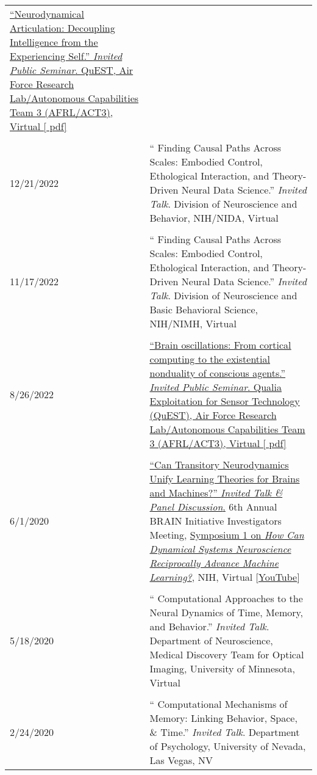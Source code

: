 \documentclass[10pt]{article}
\newcommand{\itemtitle}[1]{{\color{hopkinsblue}\ul{#1}}}
\newcommand{\unpubtitle}[1]{{\color{hopkinsblue} #1}}
\begin{document}
\begin{longtable}{@{\hspace{0.1in}}l>{\raggedright\arraybackslash}p{}}
  \href{https://jdmonaco.com/files/monaco-2023-afrl-quest-slides.pdf}
  {``\itemtitle{Neurodynamical Articulation: Decoupling Intelligence from the
  Experiencing Self}.'' \emph{Invited Public Seminar}. QuEST, Air Force Research
  Lab/Autonomous Capabilities Team 3 (AFRL/ACT3), Virtual [\unpubtitle{pdf}]} \\
  \tabularnewline
  12/21/2022 & ``\unpubtitle{Finding Causal Paths Across Scales:
  Embodied Control, Ethological Interaction, and Theory-Driven Neural Data
  Science}.'' \emph{Invited Talk}. Division of Neuroscience and Behavior,
  NIH/NIDA, Virtual \\
  \tabularnewline
  11/17/2022 & ``\unpubtitle{Finding Causal Paths Across Scales:
  Embodied Control, Ethological Interaction, and Theory-Driven Neural Data
  Science}.'' \emph{Invited Talk}. Division of Neuroscience and Basic Behavioral
  Science, NIH/NIMH, Virtual \\
  \tabularnewline
  8/26/2022 &
  \href{https://jdmonaco.com/files/monaco-2022-afrl-quest-slides.pdf}
  {``\itemtitle{Brain oscillations: From cortical computing to the existential
  nonduality of conscious agents}.'' \emph{Invited Public Seminar}. Qualia
  Exploitation for Sensor Technology (QuEST), Air Force Research Lab/Autonomous
  Capabilities Team 3 (AFRL/ACT3), Virtual [\unpubtitle{pdf}]}\\
  \tabularnewline
  6/1/2020 & \href{https://youtu.be/2jy1ENYHRAw?t=902}
  {``\itemtitle{Can Transitory Neurodynamics Unify Learning Theories for Brains
  and Machines?}'' \emph{Invited Talk \& Panel Discussion}.}
  6th Annual BRAIN Initiative Investigators Meeting,
  \href{https://www.labroots.com/webinar/symposium-1-dynamical-systems-neuroscience-reciprocally-advance-machine-learning} 
  {Symposium 1 on \unpubtitle{\emph{How Can Dynamical Systems Neuroscience
  Reciprocally Advance Machine Learning?}}}, NIH, Virtual 
  [\href{https://youtu.be/2jy1ENYHRAw?t=902}{{\itemtitle{YouTube}}}] \\
  \label{sec:symposium}
  \tabularnewline
  5/18/2020 & ``\unpubtitle{Computational Approaches to the
  Neural Dynamics of Time, Memory, and Behavior}.'' \emph{Invited Talk}.
  Department of Neuroscience, Medical Discovery Team for Optical Imaging,
  University of Minnesota, Virtual \\
  \tabularnewline
  2/24/2020 & ``\unpubtitle{Computational Mechanisms of Memory:
  Linking Behavior, Space, \& Time}.'' \emph{Invited Talk}. Department of
  Psychology, University of Nevada, Las Vegas, NV \\

\end{longtable}
\end{document}
